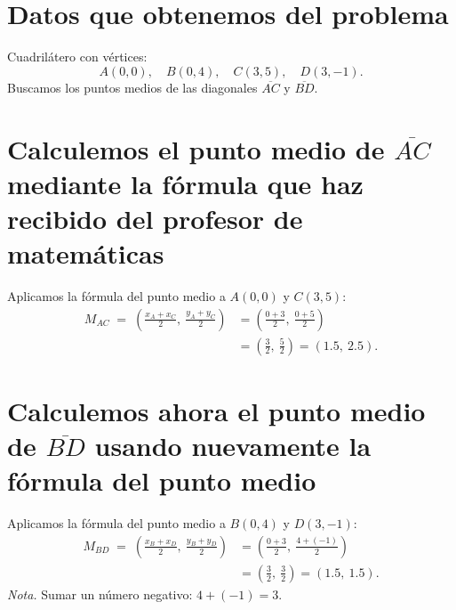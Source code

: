 \documentclass[12pt,a4paper]{article}
\begin{document}
		\section*{Datos que obtenemos del problema}
		Cuadrilátero con vértices:
		\[
		A(0,0),\quad B(0,4),\quad C(3,5),\quad D(3,-1).
		\]
		Buscamos los puntos medios de las diagonales \(\overline{AC}\) y \(\overline{BD}\).
		
		\section*{Calculemos el punto medio de \(\overline{AC}\) mediante la fórmula que haz recibido del profesor de matemáticas}
		Aplicamos la fórmula del punto medio a \(A(0,0)\) y \(C(3,5)\):
		\[
		\begin{aligned}
			M_{AC} \;=\;
			\left(\frac{x_A+x_C}{2},\ \frac{y_A+y_C}{2}\right)
			&=\left(\frac{0+3}{2},\ \frac{0+5}{2}\right) \\
			&=\left(\frac{3}{2},\ \frac{5}{2}\right)
			=(1.5,\ 2.5).
		\end{aligned}
		\]
		
		\section*{Calculemos ahora el punto medio de \(\overline{BD}\) usando nuevamente la fórmula del punto medio}
		Aplicamos la fórmula del punto medio a \(B(0,4)\) y \(D(3,-1)\):
		\[
		\begin{aligned}
			M_{BD} \;=\;
			\left(\frac{x_B+x_D}{2},\ \frac{y_B+y_D}{2}\right)
			&=\left(\frac{0+3}{2},\ \frac{4+(-1)}{2}\right) \\
			&=\left(\frac{3}{2},\ \frac{3}{2}\right)
			=(1.5,\ 1.5).
		\end{aligned}
		\]
		\emph{Nota.} Sumar un número negativo: \(4+(-1)=3\).
		
\end{document}

